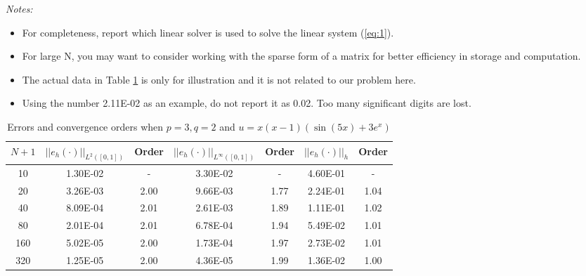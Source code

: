 \documentclass[11pt]{article}      %
\begin{document}
\begin{enumerate}
\begin{enumerate}
{\em\small Notes:
\begin{itemize}
\item For completeness, report 
which linear solver is used to solve the linear system (\ref{eq:1}).
\item For large N, you may want to consider working with the sparse form of a matrix for better efficiency in storage and computation.
 \item The actual data in Table \ref{tab1} is only for illustration and it is not related to our problem here.
 \item Using the number 2.11E-02 as an example, do not report it as 0.02. Too many significant digits are lost.
 \end{itemize}
 }
 
\begin{table}[!h]
\caption{Errors and convergence orders when $p=3, q=2$ and $u=x(x-1)(\sin(5x)+3e^x)$}
\vspace{0.1in}
\centering
\begin{tabular}{|c|c|c| c| c| c| c|}
\hline
 $N+1$&  $||e_h(\cdot)||_{L^2([0,1])}$ & Order  & $||e_h(\cdot)||_{L^\infty([0,1])}$ & Order& $||e_h(\cdot)||_h$& Order \\
 \hline
     10 & 1.30E-02 & - & 3.30E-02 & - & 4.60E-01 &- \\
     20 & 3.26E-03 & 2.00&9.66E-03   & 1.77   & 2.24E-01 &1.04\\
     40 & 8.09E-04  & 2.01 & 2.61E-03   & 1.89 & 1.11E-01 &1.02\\
     80 & 2.01E-04  & 2.01 & 6.78E-04   & 1.94 & 5.49E-02 &1.01\\
     160 & 5.02E-05   & 2.00 & 1.73E-04   &1.97  & 2.73E-02 &1.01\\
     320 &1.25E-05   & 2.00  & 4.36E-05   & 1.99 & 1.36E-02 &1.00\\
\hline
\end{tabular}
\label{tab1}
\end{table}


\end{enumerate}
\end{enumerate}
\end{document}
